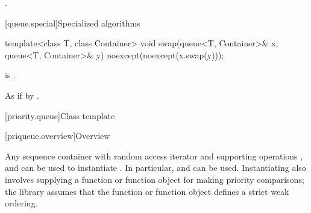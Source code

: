 \begin{itemdescr}
\pnum
\returns
{}.
\end{itemdescr}

[queue.special]{Specialized algorithms}

%
\begin{itemdecl}
template<class T, class Container>
  void swap(queue<T, Container>& x, queue<T, Container>& y) noexcept(noexcept(x.swap(y)));
\end{itemdecl}

\begin{itemdescr}
\pnum
\constraints
{} is .

\pnum
\effects
As if by .
\end{itemdescr}

[priority.queue]{Class template }

[priqueue.overview]{Overview}

\pnum
{}%
Any sequence container with random access iterator and supporting operations
,
and
can be used to instantiate
.
In particular,
and
can be used.
Instantiating
also involves supplying a function or function object for making
priority comparisons; the library assumes that the function or function
object defines a strict weak ordering.

